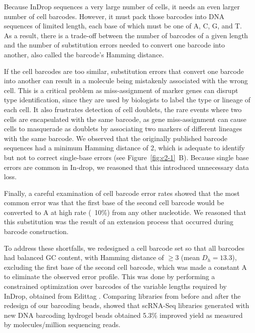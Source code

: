Because InDrop sequences a very large number of cells, it needs an even larger number of cell barcodes. 
However, it must pack those barcodes into DNA sequences of limited length, each base of which must be one of A, C, G, and T. 
As a result, there is a trade-off between the number of barcodes of a given length and the number of substitution errors needed to convert one barcode into another, also called the barcode's Hamming distance. 

If the cell barcodes are too similar, substitution errors that convert one barcode into another can result in a molecule being mistakenly associated with the wrong cell. 
This is a critical problem as miss-assignment of marker genes can disrupt type identification, since they are used by biologists to label the type or lineage of each cell. 
It also frustrates detection of cell doublets, the rare events where two cells are encapsulated with the same barcode, as gene miss-assignment can cause cells to masquerade as doublets by associating two markers of different lineages with the same barcode. 
We observed that the originally published barcode sequences had a minimum Hamming distance of 2, which is adequate to identify but not to correct single-base errors (see Figure~\ref{fig:c2-1}~B).  
Because single base errors are common in In-drop, we reasoned that this introduced unnecessary data loss.

Finally, a careful examination of cell barcode error rates showed that the most common error was that the first base of the second cell barcode would be converted to A at high rate (~10\%) from any other nucleotide. 
We reasoned that this substitution was the result of an extension process that occurred during barcode construction.  

To address these shortfalls, we redesigned a cell barcode set so that all barcodes had balanced GC content, with Hamming distance of $\ge3$ (mean $D_h = 13.3$), excluding the first base of the second cell barcode, which was made a constant A to eliminate the observed error profile.
This was done by performing a constrained optimization over barcodes of the variable lengths required by InDrop, obtained from Edittag \citep{Faircloth2012}.
Comparing libraries from before and after the redesign of our barcoding beads, showed that scRNA-Seq libraries generated with new DNA barcoding hydrogel beads obtained 5.3\% improved yield as measured by molecules/million sequencing reads. 

